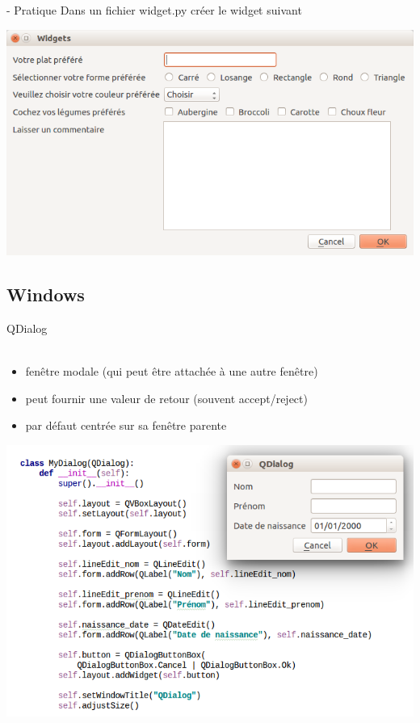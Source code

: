 \documentclass[9pt, french, brown]{beamer}
\newcommand{\mytitle}[1]{{\color{brown}#1 \\~\\}}
\begin{document}
\begin{frame}[label=pratique1]{\secname}{\subsecname{} - Pratique}
Dans un fichier widget.py créer le widget suivant
\begin{center}\includegraphics[scale=0.3]{img/widget_pratique_1_fig}\end{center}
\end{frame}

\subsection{Windows}

\begin{frame}{\secname}{\subsecname}
\mytitle{QDialog}
\begin{itemize}
\item fenêtre modale (qui peut être attachée à une autre fenêtre)
\item peut fournir une valeur de retour (souvent accept/reject)
\item par défaut centrée sur sa fenêtre parente
\end{itemize}
\begin{center}\includegraphics[scale=0.35]{img/window1_1}\end{center}
\end{frame}
\end{document}
